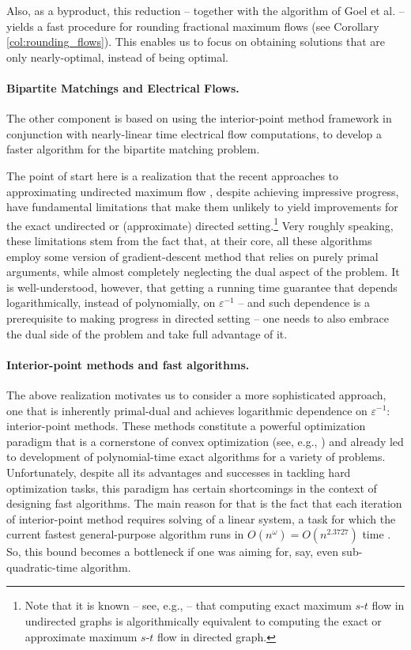 \documentclass[11pt, letterpaper]{article}
\newcommand{\eps}{\varepsilon}
\begin{document}
Also, as a byproduct, this reduction -- together with the algorithm of Goel et al. \cite{GoelKK10} -- yields a fast procedure for rounding fractional maximum flows (see Corollary \ref{col:rounding_flows}). This enables us to focus on obtaining solutions that are only nearly-optimal, instead of being optimal.

\paragraph{Bipartite Matchings and Electrical Flows.} The other component is based on using the interior-point method framework in conjunction with nearly-linear time electrical flow computations, to develop a faster algorithm for the bipartite matching problem. 

The point of start here is a realization that the recent approaches to approximating undirected maximum flow \cite{ChristianoKMST11,LeeRS13,Sherman13,KelnerLOS13}, despite achieving impressive progress, have fundamental limitations that make them unlikely to yield improvements for the exact undirected or (approximate) directed setting.\footnote{Note that it is known -- see, e.g., \cite{Madry11} -- that computing exact maximum $s$-$t$ flow in undirected graphs is algorithmically equivalent to computing the exact or approximate maximum $s$-$t$ flow in directed graph.}  Very roughly speaking, these limitations stem from the fact that, at their core, all these algorithms employ some version of gradient-descent method that relies on purely primal arguments, while almost completely neglecting the dual aspect of the problem. It is well-understood, however, that getting a running time guarantee that depends logarithmically, instead of polynomially, on $\eps^{-1}$ -- and such dependence is a prerequisite to making progress in directed setting -- one needs to also embrace  the dual side of the problem and take full advantage of it.  

\paragraph{Interior-point methods and fast algorithms.} The above realization motivates us to consider a more sophisticated approach, one that is inherently primal-dual and achieves logarithmic dependence on $\eps^{-1}$: interior-point methods. These methods constitute a powerful optimization paradigm that is a cornerstone of convex optimization (see, e.g., \cite{BoydV04,Wright97,Ye97}) and already led to development of polynomial-time exact algorithms for a variety of problems. Unfortunately, despite all its advantages and successes in tackling hard optimization tasks, this paradigm has certain shortcomings in the context of designing fast algorithms. The main reason for that is the fact that each iteration of interior-point method requires solving of a linear system, a task for which the current fastest general-purpose algorithm runs in $O(n^{\omega})=O(n^{2.3727})$ time \cite{AhoHU74,CoppersmithW90,Vassilevska12}. So, this bound becomes a bottleneck if one was aiming for, say, even sub-quadratic-time algorithm.   
\end{document}
